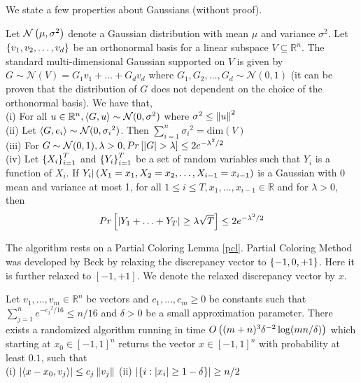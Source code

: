 We state a few properties about Gaussians (without proof).
\begin{Claim} \label{gaussian_properties}
Let $\mathcal{N}\left(\mu,{\sigma}^2 \right )$ denote a Gaussian distribution with mean $\mu$ and variance ${\sigma}^2$. Let $\left\{v_1,v_2,\hdots,v_d\right\}$ be an orthonormal basis for a linear subspace $V \subseteq \mathbb{R}^n$.
The standard multi-dimensional Gaussian supported on $V$ is given by $G \sim \mathcal{N}(V) = G_1v_1 + \hdots + G_dv_d$ where $G_1,G_2,\hdots,G_d \sim \mathcal{N}(0,1)$
(it can be proven that the distribution of $G$ does not dependent on the choice of the orthonormal basis).
We have that,\\
(i) For all $u \in \mathbb{R}^n, \left\langle G,u\right\rangle \sim \mathcal{N}(0,{\sigma}^2)$ where ${\sigma}^2 \leq \left\lVert u \right\rVert^2$\\
(ii) Let $\left\langle G,e_i\right\rangle \sim \mathcal{N}(0,{\sigma_i}^2)$.
Then $\sum_{i=1}^{n}{\sigma_i}^2 = \text{dim}(V)$\\
(iii) For $G \sim \mathcal{N}(0,1), \lambda >0, Pr\left[\left\lvert G \right\rvert>\lambda\right] \leq 2e^{-{\lambda}^2/2} $\\
(iv) Let $\left\{X_i\right\}_{i=1}^{T}$ and $\left\{Y_i\right\}_{i=1}^{T}$ be a set of random variables such that $Y_i$ is a function of $X_i$. If $Y_i|\left(X_1 = x_1,X_2=x_2,\hdots,X_{i-1}=x_{i-1} \right )$ is a Gaussian with 0 mean and variance at most 1, for all $1 \leq i \leq T,x_1,\hdots,x_{i-1}\in \mathbb{R}$ and for $\lambda > 0$, then
\[ Pr\left[\left\lvert Y_1 + \hdots + Y_T \right\rvert \geq \lambda\sqrt{T}\right] \leq 2e^{-{\lambda}^2/2} \]
\end{Claim}

The algorithm rests on a Partial Coloring Lemma \ref{pcl}. Partial Coloring Method was developed by Beck \cite{Beck1981} by relaxing the discrepancy vector to $\left\{-1,0,+1\right\}$. Here it is further relaxed to $\left[-1,+1\right]$.
We denote the relaxed discrepancy vector by $x$.

\begin{lemma} \label{pcl}
Let $v_1,\hdots,v_m \in \mathbb{R}^n$ be vectors and $c_1,\hdots,c_m \geq 0$ be constants such that $\sum_{j=1}^{n}e^{{-c_j}^2/16} \leq n/16$ and $\delta > 0$ be a small approximation parameter.
There exists a randomized algorithm running in time $O\left((m+n)^3{\delta}^{-2}\log(mn/\delta) \right )$ which starting at $x_0 \in [-1,1]^n$ returns the vector $x \in [-1,1]^n$ with probability at least $0.1$, such that\\
\qquad (i) $\left\lvert \left\langle x-x_0,v_j\right\rangle \right\rvert \leq c_j\left\lVert v_j \right\rVert$ \qquad \qquad \qquad \qquad
(ii) $\left\lvert \left\{i: \left\lvert x_i \right\rvert \geq 1- \delta\right\} \right\rvert \geq n/2$
\end{lemma}

